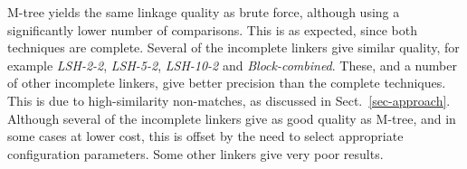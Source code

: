 \documentclass{llncs}
\begin{document}
M-tree yields the same linkage quality as brute force, although using a
significantly lower number of comparisons. This is as expected, since
both techniques are complete. Several of the incomplete linkers give
similar quality, for example \emph{LSH-2-2}, \emph{LSH-5-2},
\emph{LSH-10-2} and \emph{Block-combined}. These, and a number of other
incomplete linkers, give better precision than the complete techniques.
This is due to high-similarity non-matches, as discussed in
Sect.~\ref{sec-approach}. Although several of the incomplete linkers
give as good quality as M-tree, and in some cases at lower cost, this is
offset by the need to select appropriate configuration parameters. Some
other linkers give very poor results.

\end{document}
